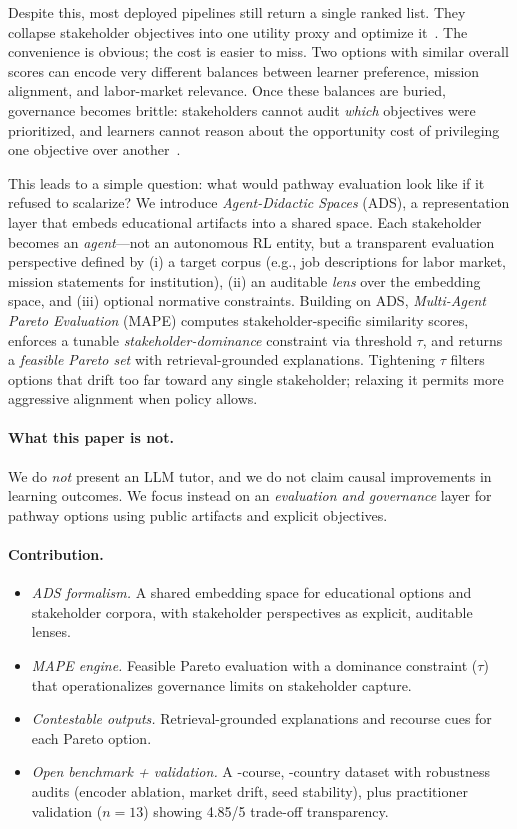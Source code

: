 \documentclass[sigconf,review]{acmart}
\newcommand{\ADS}{\textsc{ADS}\xspace}
\newcommand{\MAPE}{\textsc{MAPE}\xspace}
\begin{document}
Despite this, most deployed pipelines still return a single ranked list. They collapse stakeholder objectives into one utility proxy and optimize it~\cite{roijers2013survey_mosdm}. The convenience is obvious; the cost is easier to miss. Two options with similar overall scores can encode very different balances between learner preference, mission alignment, and labor-market relevance. Once these balances are buried, governance becomes brittle: stakeholders cannot audit \emph{which} objectives were prioritized, and learners cannot reason about the opportunity cost of privileging one objective over another~\cite{zhang2020explainableRS}.

This leads to a simple question: what would pathway evaluation look like if it refused to scalarize? We introduce \emph{Agent-Didactic Spaces} (\ADS), a representation layer that embeds educational artifacts into a shared space. Each stakeholder becomes an \emph{agent}---not an autonomous RL entity, but a transparent evaluation perspective defined by (i) a target corpus (e.g., job descriptions for labor market, mission statements for institution), (ii) an auditable \emph{lens} over the embedding space, and (iii) optional normative constraints. Building on \ADS, \emph{Multi-Agent Pareto Evaluation} (\MAPE) computes stakeholder-specific similarity scores, enforces a tunable \emph{stakeholder-dominance} constraint via threshold $\tau$, and returns a \emph{feasible Pareto set} with retrieval-grounded explanations. Tightening $\tau$ filters options that drift too far toward any single stakeholder; relaxing it permits more aggressive alignment when policy allows.

\paragraph{What this paper is not.}
We do \emph{not} present an LLM tutor, and we do not claim causal improvements in learning outcomes. We focus instead on an \emph{evaluation and governance} layer for pathway options using public artifacts and explicit objectives.

\paragraph{Contribution.}
\begin{itemize}
  \item \textit{\ADS formalism.} A shared embedding space for educational options and stakeholder corpora, with stakeholder perspectives as explicit, auditable lenses.
  \item \textit{\MAPE engine.} Feasible Pareto evaluation with a dominance constraint ($\tau$) that operationalizes governance limits on stakeholder capture.
  \item \textit{Contestable outputs.} Retrieval-grounded explanations and recourse cues for each Pareto option.
  \item \textit{Open benchmark + validation.} A {\NumCourses}-course, {\NumCountries}-country dataset with robustness audits (encoder ablation, market drift, seed stability), plus practitioner validation ($n{=}13$) showing 4.85/5 trade-off transparency.
\end{itemize}
\end{document}
